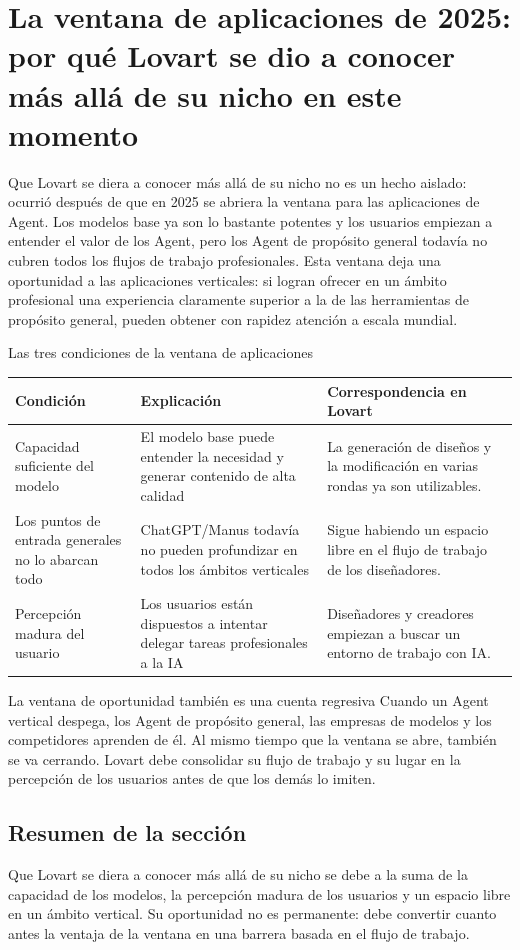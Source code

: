 \section{La ventana de aplicaciones de 2025: por qué Lovart se dio a conocer más allá de su nicho en este momento}

Que Lovart se diera a conocer más allá de su nicho no es un hecho aislado: ocurrió después de que en 2025 se abriera la ventana para las aplicaciones de Agent. Los modelos base ya son lo bastante potentes y los usuarios empiezan a entender el valor de los Agent, pero los Agent de propósito general todavía no cubren todos los flujos de trabajo profesionales. Esta ventana deja una oportunidad a las aplicaciones verticales: si logran ofrecer en un ámbito profesional una experiencia claramente superior a la de las herramientas de propósito general, pueden obtener con rapidez atención a escala mundial.

\begin{knowledgebox}{Las tres condiciones de la ventana de aplicaciones}
\begin{tabularx}{\textwidth}{p{}p{}X}
\toprule
Condición & Explicación & Correspondencia en Lovart \\
\midrule
Capacidad suficiente del modelo & El modelo base puede entender la necesidad y generar contenido de alta calidad & La generación de diseños y la modificación en varias rondas ya son utilizables. \\
Los puntos de entrada generales no lo abarcan todo & ChatGPT/Manus todavía no pueden profundizar en todos los ámbitos verticales & Sigue habiendo un espacio libre en el flujo de trabajo de los diseñadores. \\
Percepción madura del usuario & Los usuarios están dispuestos a intentar delegar tareas profesionales a la IA & Diseñadores y creadores empiezan a buscar un entorno de trabajo con IA. \\
\bottomrule
\end{tabularx}
\end{knowledgebox}

\begin{warningbox}{La ventana de oportunidad también es una cuenta regresiva}
Cuando un Agent vertical despega, los Agent de propósito general, las empresas de modelos y los competidores aprenden de él. Al mismo tiempo que la ventana se abre, también se va cerrando. Lovart debe consolidar su flujo de trabajo y su lugar en la percepción de los usuarios antes de que los demás lo imiten.
\end{warningbox}

\subsection{Resumen de la sección}

Que Lovart se diera a conocer más allá de su nicho se debe a la suma de la capacidad de los modelos, la percepción madura de los usuarios y un espacio libre en un ámbito vertical. Su oportunidad no es permanente: debe convertir cuanto antes la ventaja de la ventana en una barrera basada en el flujo de trabajo.
